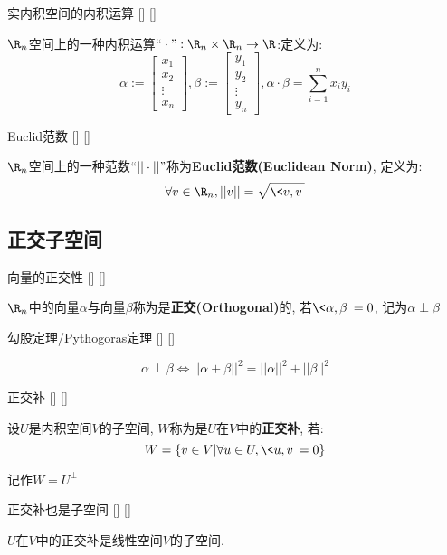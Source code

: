 \documentclass[UTF8]{ctexart}
\begin{document}
		\begin{dfn}
			[]
			{实内积空间的内积运算}
			[]
			[]

			$\R_n$空间上的一种内积运算$``\cdot":\R_n\times\R_n\to\R$:定义为: 
			\[\alpha:=\begin{bmatrix}x_1\\x_2\\\vdots\\x_n\end{bmatrix}, \beta:=\begin{bmatrix}y_1\\y_2\\\vdots\\y_n\end{bmatrix},\alpha\cdot\beta=\sum_{i=1}^{n}x_iy_i\]
		\end{dfn}
		
		\begin{dfn}
			[]
			{Euclid范数}
			[]
			[]

			$\R_n$空间上的一种范数$``||\cdot||"$称为\textbf{Euclid范数(Euclidean Norm)}, 定义为: 
			\[\forall v\in\R_n, ||v||=\sqrt{\<v,v\>}\]
		\end{dfn}
	
	\subsection{正交子空间}
		
		\begin{dfn}
			[]
			{向量的正交性}
			[]
			[]

			$\R_n$中的向量$\alpha$与向量$\beta$称为是\textbf{正交(Orthogonal)}的, 若$\<\alpha,\beta\>=0$, 记为$\alpha\perp\beta$
		\end{dfn}
		
		\begin{thm}
			[]
			{勾股定理/Pythogoras定理}
			[]
			[]

			\[\alpha\perp\beta\Longleftrightarrow||\alpha+\beta||^2=||\alpha||^2+||\beta||^2\]
		\end{thm}
		
		\begin{dfn}
			[]
			{正交补}
			[]
			[]

			设$U$是内积空间$V$的子空间, $W$称为是$U$在$V$中的\textbf{正交补}, 若: 
			\[W=\{v\in V|\forall u\in U, \<u,v\>=0\}\]

			记作$W=U^{\perp}$
		\end{dfn}

		\begin{ppt}
			[]
			{正交补也是子空间}
			[]
			[]

			$U$在$V$中的正交补是线性空间$V$的子空间. 
		\end{ppt}
		
\end{document}
